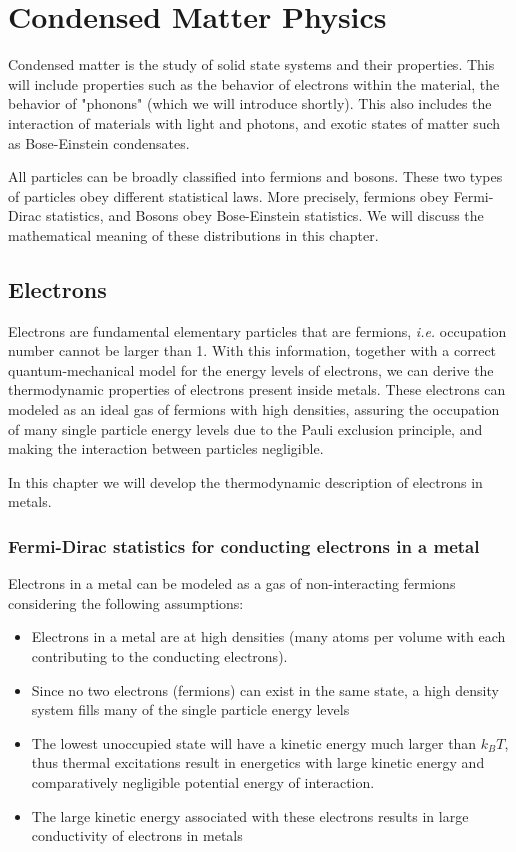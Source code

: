 \documentclass[book.tex]{subfiles}
\begin{document}
\chapter{Condensed Matter Physics}
Condensed matter is the study of solid state systems and their properties. This will include properties such as the behavior of electrons within the material, the behavior of "phonons" (which we will introduce shortly). This also includes the interaction of materials with light and photons, and exotic states of matter such as Bose-Einstein condensates.

All particles can be broadly classified into fermions and bosons. These two types of particles obey different statistical laws. More precisely, fermions obey Fermi-Dirac statistics, and Bosons obey Bose-Einstein statistics. We will discuss the mathematical meaning of these distributions in this chapter.


\section{Electrons}
Electrons are fundamental elementary particles that are fermions, \textit{i.e.} occupation number cannot be larger than 1. With this information, together with a correct quantum-mechanical model for the energy levels of electrons, we can derive the thermodynamic properties of electrons present inside metals. These electrons can modeled as an ideal gas of fermions with high densities, assuring the occupation of many single particle energy levels due to the Pauli exclusion principle, and making the interaction between particles negligible.

In this chapter we will develop the thermodynamic description of electrons in metals.

\subsection{Fermi-Dirac statistics for conducting electrons in a metal}

Electrons in a metal can be modeled as a gas of non-interacting
fermions considering the following assumptions:

\begin{itemize}
\item Electrons in a metal are at high densities (many atoms per
volume with each contributing to the conducting electrons).
\item Since no two electrons (fermions) can exist in the same state,
a high density system fills many of the single particle energy
levels
\item The lowest unoccupied state will have a kinetic energy much
larger than $k_BT$, thus thermal excitations result in energetics
with large kinetic energy and comparatively negligible potential
energy of interaction.
\item The large kinetic energy associated with these electrons results in large conductivity of electrons in metals
\end{itemize}
\end{document}
